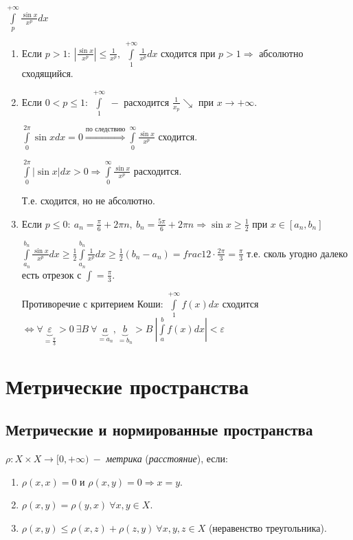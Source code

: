 \begin{example}
    $\int\limits_p^{+\infty}\frac{\sin x}{x^p}dx$

    \begin{enumerate}
        \item Если $p>1:\ |\frac{\sin x}{x^p}|\leq \frac{1}{x^p},\ \int\limits_1^{+\infty}\frac{1}{x^p}dx$ сходится при $p>1\Rightarrow$ абсолютно сходящийся.
        \item Если $0<p\leq 1:\ \int\limits_1^{+\infty}\ -$ расходится $\frac{1}{x_p}\searrow$ при $x\rightarrow +\infty$.

        $\int\limits_0^{2\pi}\sin x dx=0\overset{\text{по следствию}}{\Rightarrow}\int\limits_0^{\infty}\frac{\sin x}{x^p}$ сходится.

         $\int\limits_0^{2\pi}|\sin x|dx>0\Rightarrow\int\limits_0^{\infty}\frac{\sin x}{x^p}$ расходится.

         Т.е. сходится, но не абсолютно.
        \item Если $p\leq 0:\ a_n=\frac{\pi}{6}+2\pi n,\ b_n=\frac{5\pi}{6}+2\pi n\Rightarrow \sin x\geq \frac{1}{2}$ при $x\in[a_n, b_n]$

        $\int\limits_{a_n}^{b_n}\frac{\sin x}{x^p}dx\geq \frac{1}{2}\int\limits_{a_n}^{b_n}\frac{1}{x^p}dx\geq \frac{1}{2}(b_n-a_n)=frac{1}{2}\cdot \frac{2\pi}{3}=\frac{\pi}{3}$ т.е. сколь угодно далеко есть отрезок с $\int=\frac{\pi}{3}$.

        Противоречие с критерием Коши: $\int\limits_1^{+\infty}f(x)dx$ сходится $\Leftrightarrow \forall \underbrace{\varepsilon}_{=\frac{\pi}{3}} >0\ \exists B\ \forall \underbrace{a}_{=a_n},\underbrace{b}_{=b_n}>B\ |\int\limits_a^b f(x)dx|<\varepsilon$
    \end{enumerate}
\end{example}

\newpage
\section{Метрические пространства}
\subsection{Метрические и нормированные пространства}

\begin{definition}
    \item $\rho:X\times X\rightarrow [0,+\infty)\ -$ \textit{метрика} (\textit{расстояние}), если:
    \begin{enumerate}
        \item $\rho(x, x)=0$ и $\rho(x, y)=0\Rightarrow x=y$.
        \item $\rho(x, y)=\rho(y, x)\ \forall x, y\in X$.
        \item $\rho(x, y)\leq \rho(x, z) + \rho(z, y)\ \forall x, y, z\in X$ (неравенство треугольника).
    \end{enumerate}
\end{definition}


